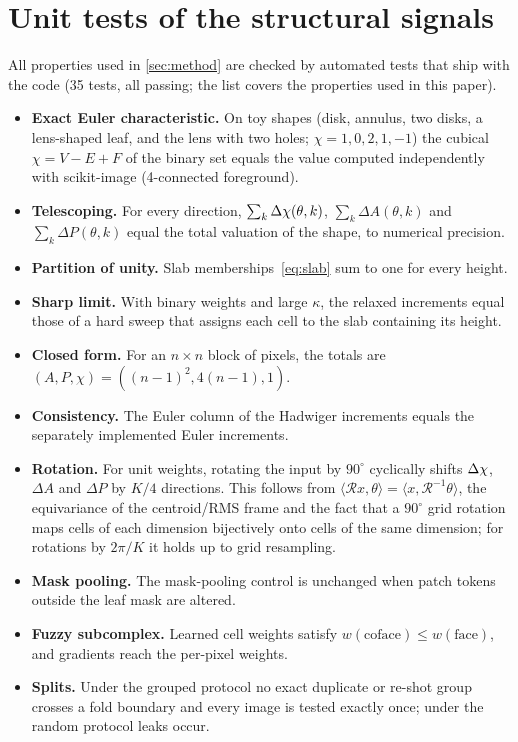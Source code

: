\section{Unit tests of the structural signals}
\label{app:tests}
All properties used in \cref{sec:method} are checked by automated tests that ship with the code
(35 tests, all passing; the list covers the properties used in this paper).
\begin{itemize}
\item \textbf{Exact Euler characteristic.} On toy shapes (disk, annulus, two disks, a lens-shaped
  leaf, and the lens with two holes; $\chi=1,0,2,1,-1$) the cubical $\chi=V-E+F$ of the binary set
  equals the value computed independently with scikit-image (4-connected foreground).
\item \textbf{Telescoping.} For every direction, $\sum_k\Delta\chi(\theta,k)$, $\sum_k\Delta A(\theta,k)$ and
  $\sum_k\Delta P(\theta,k)$ equal the total valuation of the shape, to numerical precision.
\item \textbf{Partition of unity.} Slab memberships~\eqref{eq:slab} sum to one for every height.
\item \textbf{Sharp limit.} With binary weights and large $\kappa$, the relaxed increments equal those
  of a hard sweep that assigns each cell to the slab containing its height.
\item \textbf{Closed form.} For an $n\times n$ block of pixels, the totals are
  $(A,P,\chi)=((n-1)^2,4(n-1),1)$.
\item \textbf{Consistency.} The Euler column of the Hadwiger increments equals the separately
  implemented Euler increments.
\item \textbf{Rotation.} For unit weights, rotating the input by $90^\circ$ cyclically shifts
  $\Delta\chi$, $\Delta A$ and $\Delta P$ by $K/4$ directions. This follows from
  $\langle \mathcal R x,\theta\rangle=\langle x,\mathcal R^{-1}\theta\rangle$, the equivariance of the
  centroid/RMS frame and the fact that a $90^\circ$ grid rotation maps cells of each dimension
  bijectively onto cells of the same dimension; for rotations by $2\pi/K$ it holds up to grid resampling.
\item \textbf{Mask pooling.} The mask-pooling control is unchanged when patch tokens outside the leaf
  mask are altered.
\item \textbf{Fuzzy subcomplex.} Learned cell weights satisfy $w(\text{coface})\le w(\text{face})$, and
  gradients reach the per-pixel weights.
\item \textbf{Splits.} Under the grouped protocol no exact duplicate or re-shot group crosses a fold
  boundary and every image is tested exactly once; under the random protocol leaks occur.
\end{itemize}

